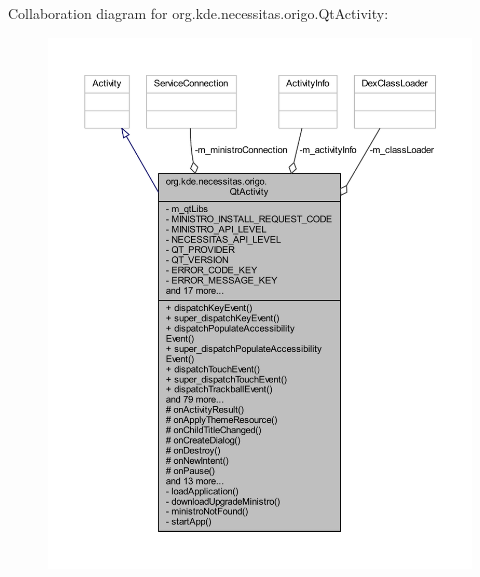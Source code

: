 Collaboration diagram for org.\-kde.\-necessitas.\-origo.\-Qt\-Activity\-:\nopagebreak
\begin{figure}[H]
\begin{center}
\leavevmode
\includegraphics[width=350pt]{d0/d2b/classorg_1_1kde_1_1necessitas_1_1origo_1_1_qt_activity__coll__graph}
\end{center}
\end{figure}

